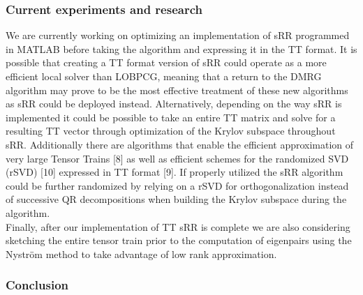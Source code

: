 \documentclass[%
 aip,12pt
 amsmath,amssymb,
 reprint,%
]{revtex4-1}
\begin{document}
\subsubsection{\label{sec:level3} Current experiments and research }
We are currently working on optimizing an implementation of sRR programmed in MATLAB before taking the algorithm and expressing it in the TT format. It is possible that creating a TT format version of sRR could operate as a more efficient local solver than LOBPCG, meaning that a return to the DMRG algorithm may prove to be the most effective treatment of these new algorithms as sRR could be deployed instead.
Alternatively, depending on the way sRR is implemented it could be possible to take an entire TT matrix and solve for a resulting TT vector through optimization of the Krylov subspace throughout sRR.
Additionally there are algorithms that enable the efficient approximation of very large Tensor Trains [8] as well as efficient schemes for the randomized SVD (rSVD) [10] expressed in TT format [9]. If properly utilized the sRR algorithm could be further randomized by relying on a rSVD for orthogonalization instead of successive QR decompositions when building the Krylov subspace during the algorithm. \\
Finally, after our implementation of TT sRR is complete we are also considering sketching the entire tensor train prior to the computation of eigenpairs using the Nyström method to take advantage of low rank approximation.\\


\subsubsection{\label{sec:level3} Conclusion}
\end{document}
